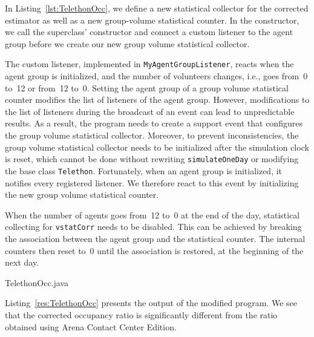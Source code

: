 In Listing~\ref{lst:TelethonOcc}, we define a new statistical
collector for the corrected estimator as well as a new group-volume
statistical counter.
In the constructor, we call the superclass' constructor and connect a
custom listener to the agent group before we create our new group
volume statistical collector.

The custom listener, implemented in
\texttt{My\-Agent\-Group\-Listener}, reacts when the agent group is
initialized, and the number of
volunteers changes, i.e., goes from~0 to~12 or from~12 to~0.
Setting the agent group of a group volume statistical counter
modifies the list of listeners of the agent group.
However, modifications to the list of listeners during the broadcast
of an event can lead to unpredictable results.  As a result,
the program needs to create a support event that configures the
group volume statistical collector.
Moreover, to
prevent inconsistencies, the group volume statistical collector needs
to be initialized after the simulation clock is reset, which cannot be
done without rewriting \texttt{simulate\-One\-Day} or modifying the
base class \texttt{Telethon}.  Fortunately, when an agent group is
initialized, it notifies every registered listener.  We therefore
react to this event by initializing the new group volume statistical
counter.

When the number of agents goes from~12 to~0 at the end of the day,
statistical collecting for \texttt{vstat\-Corr} needs to be disabled.
This can be achieved by breaking the association between the agent
group and the statistical counter.  The internal counters then reset
to~0 until the association is restored, at the beginning of the next
day.


{TelethonOcc.java}

Listing~\ref{res:TelethonOcc} presents the output of the modified
program.  We see that the corrected occupancy ratio is significantly
different from the ratio obtained using Arena Contact Center Edition.


